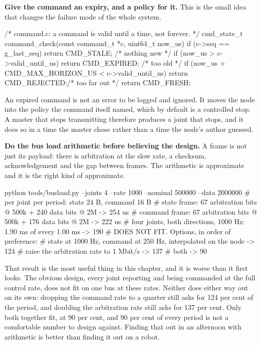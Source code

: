 \begin{steps}
\item \textbf{Give the command an expiry, and a policy for it.} This is the
small idea that changes the failure mode of the whole system.
\begin{ccode}
/* command.c: a command is valid until a time, not forever. */
cmd_state_t command_check(const command_t *c, uint64_t now_us)
{
    if (c->seq == g_last_seq)            return CMD_STALE;   /* nothing new  */
    if (now_us > c->valid_until_us)      return CMD_EXPIRED; /* too old      */
    if (now_us + CMD_MAX_HORIZON_US < c->valid_until_us)
                                         return CMD_REJECTED;/* too far out  */
    return CMD_FRESH;
}
\end{ccode}
An expired command is not an error to be logged and ignored. It moves the node
into the policy the command itself named, which by default is a controlled stop.
A master that stops transmitting therefore produces a joint that stops, and it
does so in a time the master chose rather than a time the node's author guessed.

\item \textbf{Do the bus load arithmetic before believing the design.} A frame
is not just its payload: there is arbitration at the slow rate, a checksum,
acknowledgement and the gap between frames. The arithmetic is approximate and it
is the right kind of approximate.
\begin{shellcode}
python tools/busload.py --joints 4 --rate 1000 --nominal 500000 --data 2000000
# per joint per period: state 24 B, command 16 B
# state frame:   67 arbitration bits @ 500k + 240 data bits @ 2M -> 254 us
# command frame: 67 arbitration bits @ 500k + 176 data bits @ 2M -> 222 us
# four joints, both directions, 1000 Hz: 1.90 ms of every 1.00 ms  -> 190%
# DOES NOT FIT. Options, in order of preference:
#   state at 1000 Hz, command at 250 Hz, interpolated on the node  -> 124%
#   raise the arbitration rate to 1 Mbit/s                         -> 137%
#   both                                                           ->  90%
\end{shellcode}
That result is the most useful thing in this chapter, and it is worse than it
first looks. The obvious design, every joint reporting and being commanded at
the full control rate, does not fit on one bus at these rates. Neither does
either way out on its own: dropping the command rate to a quarter still asks
for 124 per cent of the period, and doubling the arbitration rate still asks
for 137 per cent. Only both together fit, at 90 per cent, and 90 per cent of
every period is not a comfortable number to design against. Finding that out in
an afternoon with arithmetic is better than finding it out on a robot.


\end{steps}
